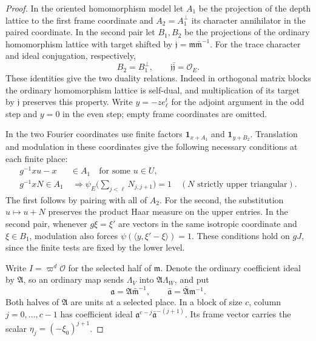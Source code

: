 \begin{proof}
In the oriented homomorphism model let \(A_1\) be the projection
of the depth lattice to the first frame coordinate and \(A_2=A_1^\perp\)
its character annihilator in the paired coordinate. In the second
pair let \(B_1,B_2\) be the projections of the ordinary homomorphism
lattice with target shifted by \(\mathfrak j=\mathfrak m\bar{\mathfrak m}^{-1}\).
For the trace character and ideal conjugation, respectively,
\[
 B_2=B_1^\perp,\qquad \mathfrak j\bar{\mathfrak j}=\mathcal O_E.
\]
These identities give the two duality relations. Indeed in orthogonal matrix blocks
the ordinary homomorphism lattice is self-dual, and multiplication
of its target by \(\mathfrak j\) preserves this property. Write
\(y=-ze_\ell^t\) for the adjoint argument in the odd step and \(y=0\)
in the even step; empty frame coordinates are omitted.

In the two Fourier coordinates use finite factors
\(\mathbf1_{x+A_1}\) and \(\mathbf1_{y+B_2}\). Translation and
modulation in these coordinates give the following necessary conditions
at each finite place:
\begin{align*}
 g^{-1}xu-x&\in A_1\quad\text{for some }u\in U,\\
 g^{-1}xN\in A_1&\ \Longrightarrow \psi_E\Big(\sum_{j<\ell}N_{j,j+1}\Big)=1
 \quad (N\text{ strictly upper triangular}).
\end{align*}
The first follows by pairing with all of \(A_2\). For the second,
the substitution \(u\mapsto u+N\) preserves the product Haar measure
on the upper entries. In the second pair, whenever \(g\xi=\xi'\)
are vectors in the same isotropic coordinate and \(\xi\in B_1\),
modulation also forces \(\psi(\langle y,\xi'-\xi\rangle)=1\).
These conditions hold on \(gJ\), since the finite tests are fixed
by the lower level.

Write \(I=\varpi^d\mathcal O\) for the selected half of
\(\mathfrak m\). Denote the ordinary coefficient ideal by
\(\mathfrak A\), so an ordinary map sends
\(\Lambda_V\) into \(\mathfrak A\Lambda_W\), and put
\[
 \mathfrak a=\mathfrak A\bar{\mathfrak m}^{-1},\qquad
 \bar{\mathfrak a}=\bar{\mathfrak A}\mathfrak m^{-1}.
\]
Both halves of \(\mathfrak A\) are units at a selected place. In a
block of size \(c\), column \(j=0,\ldots,c-1\) has coefficient ideal
\(\mathfrak a^{c-j}\bar{\mathfrak a}^{-(j+1)}\).
Its frame vector carries the scalar \(\eta_j=(-\xi_0)^{j+1}\).


\end{proof}
